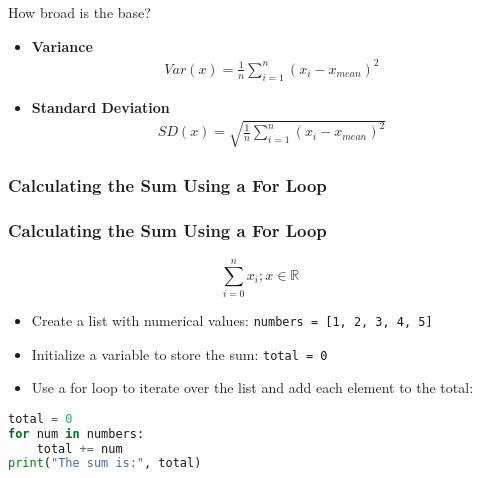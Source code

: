 \documentclass{beamer}
\begin{document}
    \begin{frame}{How broad is the base?}
        \begin{itemize}
            \item \textbf{Variance}
            \begin{align*}
                Var(x) = \frac{1}{n}\sum_{i=1}^{n}(x_{i}-x_{mean})^{2}
            \end{align*}
            \item \textbf{Standard Deviation}
            \begin{align*}
                SD(x) = \sqrt{\frac{1}{n}\sum_{i=1}^{n}(x_{i}-x_{mean})^{2}}
            \end{align*}
        \end{itemize}
    \end{frame}
    \subsubsection{Calculating the Sum Using a For Loop}
    \begin{frame}[fragile]
        \frametitle{Calculating the Sum Using a For Loop}
        \begin{equation*}
            \sum_{i=0}^{n} x_{i}; x \in \mathbb{R}
        \end{equation*}
        \begin{itemize}
            \item Create a list with numerical values: \texttt{numbers = [1, 2, 3, 4, 5]}
            \item Initialize a variable to store the sum: \texttt{total = 0}
            \item Use a for loop to iterate over the list and add each element to the total:
        \end{itemize}
        \begin{lstlisting}[language=Python]
total = 0
for num in numbers:
    total += num
print("The sum is:", total)
        \end{lstlisting}
    \end{frame}
\end{document}
